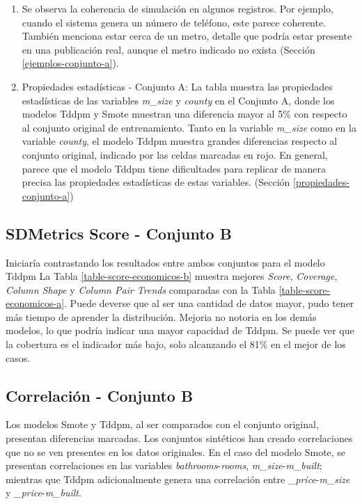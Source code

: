 \begin{enumerate}
    \item Se observa la coherencia de simulación en algunos registros. Por ejemplo, cuando el sistema genera un número de teléfono, este parece coherente. También menciona estar cerca de un metro, detalle que podría estar presente en una publicación real, aunque el metro indicado no exista (Sección \ref{ejemplos-conjunto-a}).
    
    \item Propiedades estadísticas - Conjunto A: La tabla muestra las propiedades estadísticas de las variables \emph{m\_size} y \emph{county} en el Conjunto A, donde los modelos Tddpm y Smote muestran una diferencia mayor al 5\% con respecto al conjunto original de entrenamiento. Tanto en la variable \emph{m\_size} como en la variable \emph{county}, el modelo Tddpm muestra grandes diferencias respecto al conjunto original, indicado por las celdas marcadas en rojo. En general, parece que el modelo Tddpm tiene dificultades para replicar de manera precisa las propiedades estadísticas de estas variables. (Sección \ref{propiedades-conjunto-a})
    
\end{enumerate}


\newpage
\subsection{SDMetrics Score - Conjunto B}
\label{ds-conjunto-b}
Iniciaría contrastando los resultados entre ambos conjuntos para el modelo Tddpm La Tabla \ref{table-score-economicos-b} muestra mejores \emph{Score}, \emph{Coverage}, \emph{Column Shape} y \emph{Column Pair Trends} comparadas con la Tabla \ref{table-score-economicos-a}. Puede deverse que al ser una cantidad de datos mayor, pudo tener más tiempo de aprender la distribución. Mejoria no notoria en los demás modelos, lo que podría indicar una mayor capacidad de Tddpm. Se puede ver que la cobertura es el indicador más bajo, solo alcanzando el 81\% en el mejor de los casos.



\newpage
\subsection{Correlación - Conjunto B}
\label{correlacion-conjunto-b}
Los modelos Smote y Tddpm, al ser comparados con el conjunto original, presentan diferencias marcadas. Los conjuntos sintéticos han creado correlaciones que no se ven presentes en los datos originales. En el caso del modelo Smote, se presentan correlaciones en las variables \emph{bathrooms}-\emph{rooms}, \emph{m\_size}-\emph{m\_built}; mientras que Tddpm adicionalmente genera una correlación entre \emph{\_price}-\emph{m\_size} y \emph{\_price}-\emph{m\_built}.


